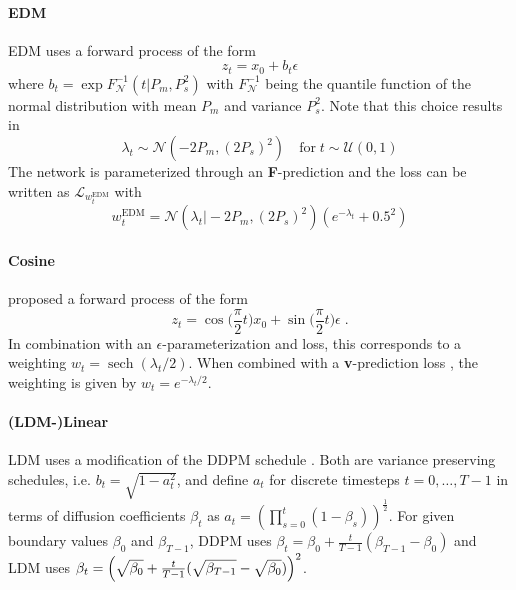 \paragraph{EDM}
EDM \cite{Karras2022ElucidatingTD} uses a forward process of the form
\begin{equation}
  z_t = x_0 + b_t \epsilon
\end{equation}
where \cite{Kingma2023UnderstandingDO}
%
$ b_t = \exp{F_{\mathcal{N}}^{-1}(t \vert P_m, P_s^2)} $
%
with $F_{\mathcal{N}}^{-1}$ being the quantile function of the normal
distribution with mean $P_m$ and variance $P_s^2$. Note that this choice results in
\begin{equation}
  \lambda_t \sim \mathcal{N}(-2P_m, (2P_s)^2)\quad\text{for}\;t\sim
  \mathcal{U}(0,1)
\end{equation}
The %
network is parameterized through an \textbf{F}-prediction
\cite{Kingma2023UnderstandingDO,Karras2022ElucidatingTD} and the loss can be
written as $\mathcal{L}_{w_t^\text{EDM}}$ with
\begin{equation}
  w_t^\text{EDM} = \mathcal{N}(\lambda_t \vert -2P_m, (2P_s)^2)(e^{-\lambda_t}+0.5^2)
\end{equation}

\paragraph{Cosine}
\cite{nichol2021improved} proposed a forward process of the form
\begin{equation}
  z_t = \cos\bigl(\frac{\pi}{2} t\bigr) x_0 + \sin\bigl(\frac{\pi}{2} t\bigr) \epsilon\;.
\end{equation}
In combination with an $\epsilon$-parameterization and loss, this corresponds
to a weighting $w_t = \operatorname{sech}(\lambda_t/2)$.
When combined with a \textbf{v}-prediction loss
\cite{Kingma2023UnderstandingDO}, the weighting is given by $w_t = e^{-\lambda_t/2}$.

\paragraph{(LDM-)Linear}
LDM \cite{Rombach_2022} uses a modification of the DDPM schedule \cite{ho2020denoising}. Both are
variance preserving schedules, i.e. $b_t=\sqrt{1-a_t^2}$, and define $a_t$ for
discrete timesteps $t = 0, \dots, T-1$ in terms of diffusion coefficients
$\beta_t$ as
%
$ a_t  = (\prod_{s=0}^t (1 - \beta_s))^{\frac{1}{2}}$.
%
For given boundary values $\beta_0$ and $\beta_{T-1}$, DDPM uses
%
$ \beta_t = \beta_0 + \frac{t}{T-1} (\beta_{T-1} - \beta_0) $
%
and LDM uses
%
$\beta_t = \left( \sqrt{\beta_0\vphantom{\beta_{T-1}}} + \frac{t}{T-1} (\sqrt{\beta_{T-1}} - \sqrt{\beta_0\vphantom{\beta_{T-1}}}) \right)^2$. 
%

